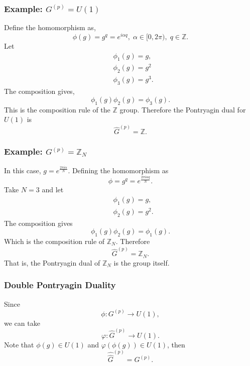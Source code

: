 \documentclass{article}
\begin{document}
\subsubsection*{Example: $G^{(p)}=U(1)$}
\noindent Define the homomorphism as,
\begin{equation}
	\phi(g)=g^q=e^{i\alpha q},\; \alpha\in [0,2\pi),\;q\in\mathbb{Z}.
\end{equation}
Let 
\begin{align}
	&\phi_1(g)=g,\\
	&\phi_2(g)=g^2\\
	&\phi_3(g)=g^3.
\end{align}
The composition gives, 
\begin{equation}
	\phi_1(g)\phi_2(g)=\phi_3(g). 
\end{equation}
This is the composition rule of the $\mathbb{Z}$ group. Therefore the Pontryagin dual for $U(1)$ is 
\begin{equation}
	\widehat{G}^{(p)}=\mathbb{Z}.
\end{equation}
\subsubsection*{Example: $G^{(p)}=\mathbb{Z}_N$}
In this case, $g=e^{\frac{2\pi i\alpha}{N}}$. Defining the homomorphism as 
\begin{equation}
	\phi=g^q=e^{\frac{2\pi i\alpha q}{N}}.
\end{equation}
Take $N=3$ and let 
\begin{align}
	&\phi_1(g)=g,\\
	&\phi_2(g)=g^2. 
\end{align}
The composition gives 
\begin{equation}
	\phi_1(g)\phi_2(g)=\phi_1(g).
\end{equation}
Which is the composition rule of $\mathbb{Z}_N$. Therefore
\begin{equation}
	\widehat{G}^{(p)}=\mathbb{Z}_N.
\end{equation}
That is, the Pontryagin dual of $\mathbb{Z}_N$ is the group itself. 
\subsubsection*{Double Pontryagin Duality}
Since 
\begin{equation}
	\phi:G^{(p)}\to U(1),
\end{equation}
we can take 
\begin{equation}
	\varphi:\widehat{G}^{(p)}\to U(1). 
\end{equation}
Note that $\phi(g)\in U(1)$ and $\varphi(\phi(g))\in U(1)$, then 
\begin{equation}
	\widehat{\widehat{G}}^{(p)}=G^{(p)}.
\end{equation}
\end{document}
